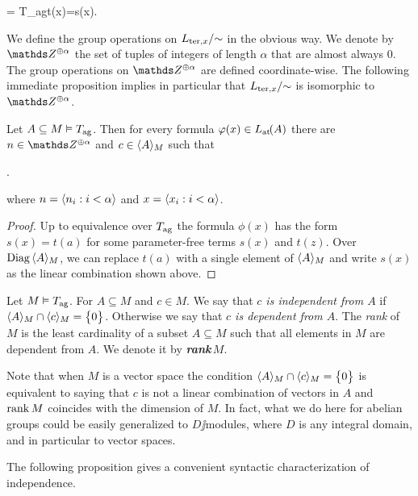 \documentclass[creche.tex]{subfiles}
\begin{document}
%
{=}%
{T_{\rm ag}\proves t(x)=s(x).}

We define the group operations on $L_{{\rm ter},x}/\mathord{\sim}$ in the obvious way. We denote by $\ZZ^{\oplus\alpha}$ the set of tuples of integers of length $\alpha$ that are almost always $0$. The group operations on $\ZZ^{\oplus\alpha}$ are defined coordinate-wise. The following immediate proposition implies in particular that  $L_{{\rm ter},x}/\mathord{\sim}$ is isomorphic to $\ZZ^{\oplus\alpha}$.

\begin{proposition}
\label{corol_formacanonicaterminimoduli}
Let $A\subseteq M\models T_{\rm ag}$. Then for every formula $\phi(x)\in\atL(A)$ there are $n\in\ZZ^{\oplus\alpha}$ and $c\in\<A\>_M$ such that 

.

where $n=\<n_i:i<\alpha\>$ and  $x=\<x_i:i<\alpha\>$.\QED

\end{proposition}

\begin{proof}
Up to equivalence over $T_{\rm ag}$ the formula $\phi(x)$ has the form $s(x)=t(a)$ for some parameter-free terms $s(x)$ and $t(z)$. Over $\Diag\,\<A\>_M$, we can replace $t(a)$ with a single element of  $\<A\>_M$ and write $s(x)$ as the linear combination shown above.
\end{proof}


\begin{definition} Let $M\models T_{\rm ag}$. For $A\subseteq M$ and  $c\in M$. We say that  \emph{$c$ is independent from $A$\/} if $\<A\>_M\cap\<c\>_M=\big\{0\big\}$. Otherwise we say that \emph{$c$ is dependent from $A$}. The \emph{rank\/} of $M$ is the least cardinality of a subset $A\subseteq M$ such that all elements in $M$ are dependent from $A$. We denote it by \emph{\rm\bf rank\,$M$}.\QED
\end{definition}  

Note that when $M$ is a vector space the condition $\<A\>_M\cap\<c\>_M=\big\{0\big\}$ is equivalent to saying that $c$ is not a linear combination of vectors in $A$ and $\rank M$ coincides with the dimension of $M$. In fact, what we do here for abelian groups could be easily generalized to $D\jj$modules, where $D$ is any integral domain, and in particular to vector spaces.

The following proposition gives a convenient syntactic characterization of independence.
\end{document}
